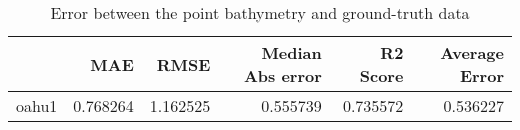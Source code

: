 \begin{table}[h!]
\caption{Error between the point bathymetry and ground-truth data}
\label{tab:oahu1_lidar_error}
\begin{tabular}{lrrrrr}
\toprule
 & MAE & RMSE & Median Abs error & R2 Score & Average Error \\
\midrule
oahu1 & 0.768264 & 1.162525 & 0.555739 & 0.735572 & 0.536227 \\
\bottomrule
\end{tabular}
\end{table}
